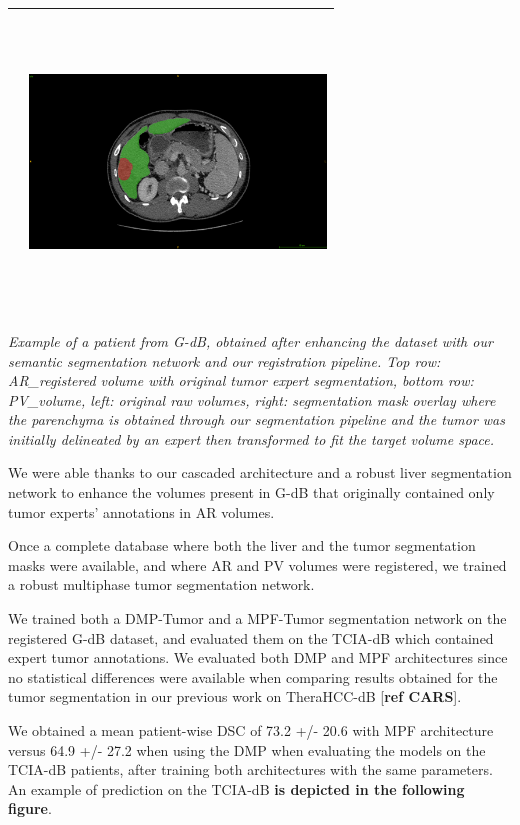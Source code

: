 \documentclass[]{article}
\begin{document}
\begin{longtable}[c]{@{}ll@{}}
&
\includegraphics[width=3.10417in,height=3.09722in]{./images/media/image5.png}\tabularnewline
\bottomrule
\end{longtable}

\emph{Example of a patient from G-dB, obtained after enhancing the
dataset with our semantic segmentation network and our registration
pipeline. Top row: AR\_registered volume with original tumor expert
segmentation, bottom row: PV\_volume, left: original raw volumes, right:
segmentation mask overlay where the parenchyma is obtained through our
segmentation pipeline and the tumor was initially delineated by an
expert then transformed to fit the target volume space.}

We were able thanks to our cascaded architecture and a robust liver
segmentation network to enhance the volumes present in G-dB that
originally contained only tumor experts' annotations in AR volumes.

Once a complete database where both the liver and the tumor segmentation
masks were available, and where AR and PV volumes were registered, we
trained a robust multiphase tumor segmentation network.

We trained both a DMP-Tumor and a MPF-Tumor segmentation network on the
registered G-dB dataset, and evaluated them on the TCIA-dB which
contained expert tumor annotations. We evaluated both DMP and MPF
architectures since no statistical differences were available when
comparing results obtained for the tumor segmentation in our previous
work on TheraHCC-dB {[}\textbf{ref CARS}{]}.

We obtained a mean patient-wise DSC of 73.2 +/- 20.6 with MPF
architecture versus 64.9 +/- 27.2 when using the DMP when evaluating the
models on the TCIA-dB patients, after training both architectures with
the same parameters. An example of prediction on the TCIA-dB \textbf{is
depicted in the following figure}.
\end{document}
